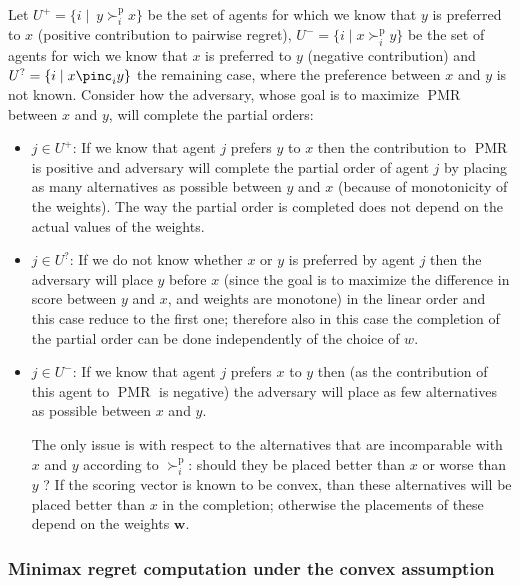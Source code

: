 \documentclass[12pt]{article}
\newcommand{\ppref}{\succ^\text{p}}%
\newcommand{\w}{\textbf{w}}%
\DeclareMathOperator{\PMR}{PMR}
\begin{document}
Let $U^+=\{ i \mid \ y \ppref_i x\}$ be the set of agents for which we know that $y$ is preferred to $x$ (positive contribution to pairwise regret), $U^-=\{ i \mid x \ppref_i y\}$ 
be the set of agents for wich we  know that $x$ is preferred to $y$ (negative contribution) and 
$U^?=\{ i \mid x \pinc_i y\}$ 
the remaining case, where the preference between $x$ and $y$ is not known.
Consider how the adversary, whose goal is to maximize $\PMR$ between $x$ and $y$, will complete the partial orders:
\begin{itemize}
 \item $j \in U^+$: If we know that agent $j$ prefers $y$ to $x$ then the contribution to $\PMR$ is positive and adversary will complete the partial order of agent $j$ by placing as many alternatives as possible between $y$ and $x$ (because of monotonicity of the weights).
 The way the partial order is completed does not depend on the actual values of the weights.

 \item $j \in U^?$: If we do not know whether $x$ or $y$ is preferred by agent $j$ then the adversary will place $y$ before $x$ (since the goal is to maximize the difference in score between $y$ and $x$, and weights are monotone) in the linear order and this case reduce to the first one; therefore also in this case the completion of the partial order can be done independently of the choice of $w$.

 \item $j \in U^-$: If we know that agent $j$ prefers $x$ to $y$ then (as the contribution of this agent to $\PMR$ is negative) the adversary will place as few alternatives as possible between $x$ and $y$.

The only issue is with respect to the  alternatives that are incomparable with $x$ and $y$ according to $\ppref_i$: should they be placed better than $x$ or worse than $y$ ?
If the scoring vector is known to be convex,  than these alternatives will be placed better than $x$ in the completion; otherwise the placements of these depend on the weights $\w$.
\end{itemize}

\subsubsection{Minimax regret computation under the convex assumption}
\end{document}
